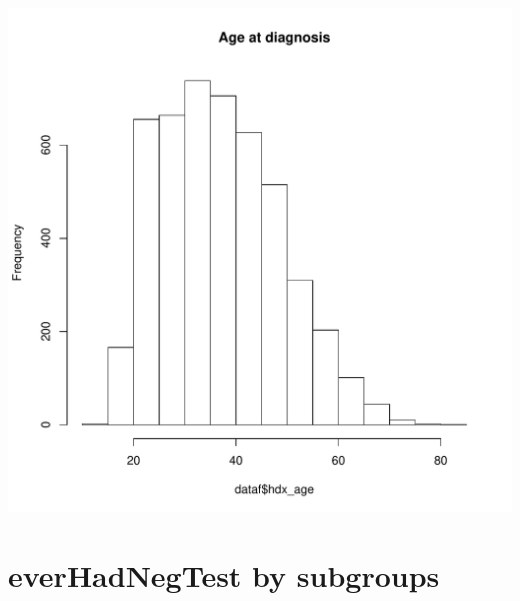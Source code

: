 \documentclass{article}\usepackage[]{graphicx}\usepackage[]{color}
\makeatletter
\def\maxwidth{ %
  \ifdim\Gin@nat@width>\linewidth
    \linewidth
  \else
    \Gin@nat@width
  \fi
}
\newenvironment{knitrout}{}{} %
\makeatother
\begin{document}
\begin{knitrout}\footnotesize
{}\color{fgcolor}

{\centering \includegraphics[width=\maxwidth]{figure/minimal-age} 

}



\end{knitrout}


\section{everHadNegTest by subgroups}
\end{document}
